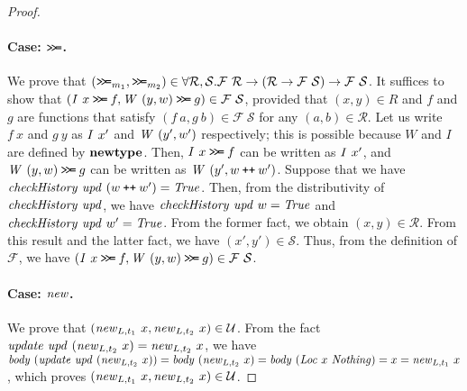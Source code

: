 \documentclass{article}
\theoremstyle{definition}
\newcommand{\BIND}{\mathbin{\texttt{>\!>\!=}}}
\newcommand{\APPEND}{\mathbin{\texttt{++}}}
\begin{document}
\begin{proof}
\paragraph{Case: $\BIND$.}
We prove that $(\BIND_{m_1}, \BIND_{m_2}) \in \forall
\mathcal{R},\mathcal{S}. \mathcal{F}~\mathcal{R} \to (\mathcal{R} \to
\mathcal{F}~\mathcal{S}) \to \mathcal{F}~\mathcal{S}$.  It suffices to
show that $(\mi{I}~x \BIND f, \mi{W}~(y,w) \BIND g) \in
\mathcal{F}~\mathcal{S}$, provided that $(x,y) \in R$ and $f$ and $g$
are functions that satisfy $(f~a, g~b) \in \mathcal{F}~\mathcal{S}$
for any $(a,b) \in \mathcal{R}$. Let us write $f~x$ and $g~y$ as
$\mathit{I}~x'$ and $\mathit{W}~(y',w')$ respectively; this is possible because $W$ and $I$ are defined by $\mathbf{newtype}$. 
Then, $\mi{I}~x \BIND f$ can be written as $\mathit{I}~x'$, and 
$\mi{W}~(y,w) \BIND g$ can be written as $\mi{W}~(y',w \APPEND w')$.  
Suppose that we have
$\mi{checkHistory}~\mi{upd}~(w \APPEND w') = \mi{True}$. Then, from
the distributivity of $\mathit{checkHistory}~\mathit{upd}$, we have
$\mathit{checkHistory}~\mathit{upd}~w = \mathit{True}$ and
$\mathit{checkHistory}~\mathit{upd}~w' = \mathit{True}$. From the former fact, we
obtain $(x,y) \in \mathcal{R}$. From this result and the latter fact,
we have $(x',y') \in \mathcal{S}$.  Thus, from the definition of
$\mathcal{F}$, we have $(\mi{I}~x \BIND f, \mi{W}~(y,w) \BIND g) \in
\mathcal{F}~\mathcal{S}$.


\paragraph{Case: $\mathit{new}$.}
We prove that $(\mathit{new}_{L,t_1}~x,\mathit{new}_{L,t_2}~x) \in \mathcal{U}$.
From the fact 
 $\mathit{update}~\mathit{upd}~(\mathit{new}_{L,t_2}~x) = \mathit{new}_{L,t_2}~x$, we
have $\mathit{body}~(\mathit{update}~\mathit{upd}~(\mathit{new}_{L,t_2}~x)) = 
\mathit{body}~(\mathit{new}_{L,t_2}~x) = \mathit{body}~(\mathit{Loc}~x~\mathit{Nothing}) = x = \mathit{new}_{L,t_1}~x$, which proves $(\mathit{new}_{L,t_1}~x,\mathit{new}_{L,t_2}~x) \in \mathcal{U}$.


\end{proof}
\end{document}
